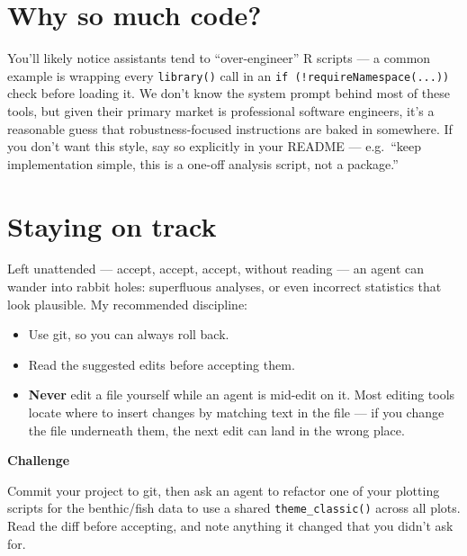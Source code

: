\documentclass[
  letterpaper,
  DIV=11,
  numbers=noendperiod]{scrreprt}
\providecommand{\tightlist}{%
  \setlength{\itemsep}{0pt}\setlength{\parskip}{0pt}}
\begin{document}
\section{Why so much code?}\label{why-so-much-code}

You'll likely notice assistants tend to ``over-engineer'' R scripts ---
a common example is wrapping every \texttt{library()} call in an
\texttt{if\ (!requireNamespace(...))} check before loading it. We don't
know the system prompt behind most of these tools, but given their
primary market is professional software engineers, it's a reasonable
guess that robustness-focused instructions are baked in somewhere. If
you don't want this style, say so explicitly in your README ---
e.g.~``keep implementation simple, this is a one-off analysis script,
not a package.''

\section{Staying on track}\label{staying-on-track}

Left unattended --- accept, accept, accept, without reading --- an agent
can wander into rabbit holes: superfluous analyses, or even incorrect
statistics that look plausible. My recommended discipline:

\begin{itemize}
\tightlist
\item
  Use git, so you can always roll back.
\item
  Read the suggested edits before accepting them.
\item
  \textbf{Never} edit a file yourself while an agent is mid-edit on it.
  Most editing tools locate where to insert changes by matching text in
  the file --- if you change the file underneath them, the next edit can
  land in the wrong place.
\end{itemize}

\begin{tcolorbox}[enhanced jigsaw, toprule=.15mm, rightrule=.15mm, left=2mm, leftrule=.75mm, breakable, opacityback=0, arc=.35mm, colframe=quarto-callout-important-color-frame, bottomrule=.15mm, colback=white]
\begin{minipage}[t]{5.5mm}
\textcolor{quarto-callout-important-color}{\faExclamation}
\end{minipage}%
\begin{minipage}[t]{\textwidth - 5.5mm}

\vspace{-3mm}\textbf{Challenge}\vspace{3mm}

Commit your project to git, then ask an agent to refactor one of your
plotting scripts for the benthic/fish data to use a shared
\texttt{theme\_classic()} across all plots. Read the diff before
accepting, and note anything it changed that you didn't ask for.

\end{minipage}%
\end{tcolorbox}
\end{document}
